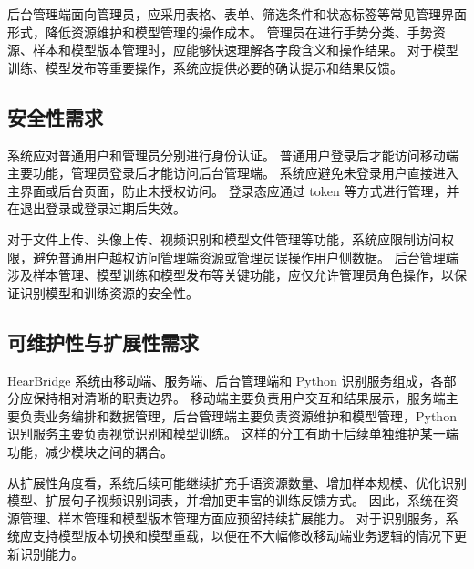 后台管理端面向管理员，应采用表格、表单、筛选条件和状态标签等常见管理界面形式，降低资源维护和模型管理的操作成本。
管理员在进行手势分类、手势资源、样本和模型版本管理时，应能够快速理解各字段含义和操作结果。
对于模型训练、模型发布等重要操作，系统应提供必要的确认提示和结果反馈。

\subsection{安全性需求}

系统应对普通用户和管理员分别进行身份认证。
普通用户登录后才能访问移动端主要功能，管理员登录后才能访问后台管理端。
系统应避免未登录用户直接进入主界面或后台页面，防止未授权访问。
登录态应通过 token 等方式进行管理，并在退出登录或登录过期后失效。

对于文件上传、头像上传、视频识别和模型文件管理等功能，系统应限制访问权限，避免普通用户越权访问管理端资源或管理员误操作用户侧数据。
后台管理端涉及样本管理、模型训练和模型发布等关键功能，应仅允许管理员角色操作，以保证识别模型和训练资源的安全性。

\subsection{可维护性与扩展性需求}

HearBridge 系统由移动端、服务端、后台管理端和 Python 识别服务组成，各部分应保持相对清晰的职责边界。
移动端主要负责用户交互和结果展示，服务端主要负责业务编排和数据管理，后台管理端主要负责资源维护和模型管理，Python 识别服务主要负责视觉识别和模型训练。
这样的分工有助于后续单独维护某一端功能，减少模块之间的耦合。

从扩展性角度看，系统后续可能继续扩充手语资源数量、增加样本规模、优化识别模型、扩展句子视频识别词表，并增加更丰富的训练反馈方式。
因此，系统在资源管理、样本管理和模型版本管理方面应预留持续扩展能力。
对于识别服务，系统应支持模型版本切换和模型重载，以便在不大幅修改移动端业务逻辑的情况下更新识别能力。
